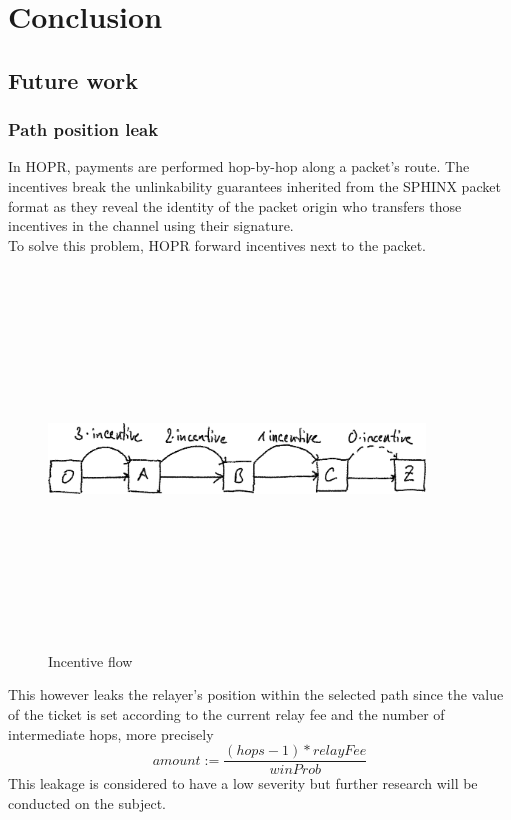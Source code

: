 \section{Conclusion}
\subsection{Future work}
\subsubsection{Path position leak}
In HOPR, payments are performed hop-by-hop along a packet’s route.
The incentives break the unlinkability guarantees inherited from the SPHINX packet format as they reveal the identity of the packet origin who transfers those incentives in the channel using their signature. 
\\To solve this problem, HOPR forward incentives next to the packet.
\begin{figure}[H]
    \centering
    \includegraphics[width=10cm,height=10cm,keepaspectratio]{../whitepaper/images/token_cashflow.png}
    \caption{Incentive flow}
    \label{fig:Incentive flow}
    \end{figure}

    \hspace{-5mm}This however leaks the relayer’s position within the selected path since the value of the ticket is set according to the current relay fee and the number of intermediate hops, 
more precisely $$amount:=\frac{(hops -1)* relayFee}{winProb}$$
This leakage is considered to have a low severity but further research will be conducted on the subject.
